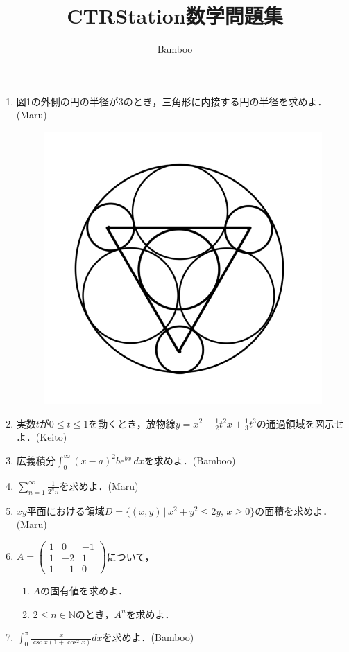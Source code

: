 \documentclass{ltjsarticle}
\title{CTRStation数学問題集}
\author{Bamboo}
\begin{document}
\maketitle

\begin{enumerate}
  \setlength{\parskip}{4cm}
  \everymath{\displaystyle}

  \item 図1の外側の円の半径が3のとき，三角形に内接する円の半径を求めよ．(Maru)

  \begin{figure}[htbp]
  \centering
  \includegraphics[scale=0.3]{radius.png}
  \caption{}
  \end{figure}

  \item 実数$t$が$0\le t\le1$を動くとき，放物線$y=x^2-\frac{1}{2}t^2x+\frac{1}{3}t^3$の通過領域を図示せよ．(Keito)
  \item 広義積分$\int_{0}^{∞}(x-a)^2be^{bx}\,dx$を求めよ．(Bamboo)
  \item $\sum_{n=1}^\infty \frac{1}{2^nn}$を求めよ．(Maru)
  \item $xy$平面における領域$D=\{(x,y)\,|\,x^2+y^2\le2y,\,x\ge0\}$の面積を求めよ．(Maru)

  \item $A=\begin{pmatrix}
    1 & 0 & -1 \\
    1 & -2 & 1 \\
    1 & -1 & 0
  \end{pmatrix}$について，
  \setlength{\parskip}{1.8cm}
  \begin{enumerate}
    \setlength{\parskip}{4cm}
    \item $A$の固有値を求めよ．
    \item $2\le n\in \mathbb{N}$のとき，$A^n$を求めよ．
  \end{enumerate}

  \setlength{\parskip}{4cm}

  \item $\int_{0}^{\pi}\frac{x}{\csc x(1+\cos ^2 x)}dx$を求めよ．(Bamboo)

\end{enumerate}
\end{document}
